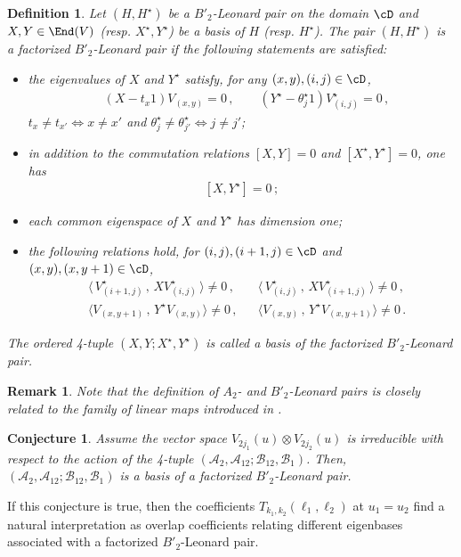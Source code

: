 \documentclass[11pt]{amsart}
\numberwithin{equation}{section}
\newtheorem{defi}[thm]{Definition}
\newtheorem{conj}[thm]{Conjecture}
\newtheorem{rem}[thm]{Remark}
\numberwithin{equation}{section}
\begin{document}
\begin{defi}\label{def:flp}
Let $(H,H^\star)$ be a $B'_2$-Leonard pair on the domain $\cD$ and $X,Y\in \End(V)$ (resp. $X^\star,Y^\star$) be a basis of $H$ (resp. $H^\star$).
The pair $(H,H^\star)$ is a \textit{factorized $B'_2$-Leonard pair} if the following statements are satisfied:
\begin{itemize}
 \item[(viii)] the eigenvalues of $X$ and $Y^\star$ satisfy, for any $(x,y),(i,j)\in \cD$,
 \begin{align}\label{eq:eigenXY}
 & (X-t_x 1) V_{(x,y)} =0 \,,  \qquad 
 (Y^\star-\theta^\star_j 1) V^\star_{(i,j)} =0 \,,
  \end{align}
 $t_x\neq t_{x'} \Leftrightarrow x\neq x'$ 
  and $\theta^\star_j\neq \theta^\star_{j'} \Leftrightarrow j\neq j'$;
 \item[(ix)] in addition to the commutation relations $[X,Y]=0$ and $[X^\star,Y^\star]=0$, one has
 \begin{align}\label{eq:com1}
  [X,Y^\star]=0\,;
 \end{align}
 \item[(x)] each common eigenspace of $X$ and $Y^\star$ has dimension one;
   \item[(xi)]   
  the following relations hold, for $(i,j),(i+1,j)\in \cD$ and $(x,y),(x,y+1)\in \cD$,
 \begin{subequations}
      \begin{align}
 & \langle\, V^\star_{(i+1,j)}\, ,\, X V^\star_{(i,j)}\,\rangle\neq 0\,,&& \langle\, V^\star_{(i,j)}\, ,\, X V^\star_{(i+1,j)}\,\rangle\neq 0\,, \label{eq:irre1}\\
      &\langle V_{(x,y+1)}\,,\, Y^\star V_{(x,y)}\rangle \neq 0\,,&& \langle V_{(x,y)}\,,\, Y^\star V_{(x,y+1)}\rangle \neq 0\,.\label{eq:irre2}
  \end{align} 
  \end{subequations}
 \end{itemize}
 The ordered 4-tuple $(X,Y;X^\star,Y^\star)$ is called a basis of the factorized $B'_2$-Leonard pair.
 \end{defi}
\begin{rem}
Note that the definition of $A_2$- and $B'_2$-Leonard pairs is closely related to the family of linear maps introduced in \cite[Problem\,7.1]{TI10}.
\end{rem}

\begin{conj}\label{conj:FPBp2} Assume the vector space $V_{2j_1}(u)\otimes V_{2j_2}(u)$ is irreducible with respect to the action of the 4-tuple $(\mathcal{A}_2,\mathcal{A}_{12};\mathcal{B}_{12},\mathcal{B}_1)$. Then, $(\mathcal{A}_2,\mathcal{A}_{12};\mathcal{B}_{12},\mathcal{B}_1)$ is a basis of a factorized $B'_2$-Leonard pair.
\end{conj}
If this conjecture is true, then the coefficients $T_{k_1,k_2}(\ell_1,\ell_2)$ at $u_1=u_2$ find a natural interpretation as overlap coefficients relating different eigenbases associated with a factorized $B'_2$-Leonard pair. 
\end{document}
